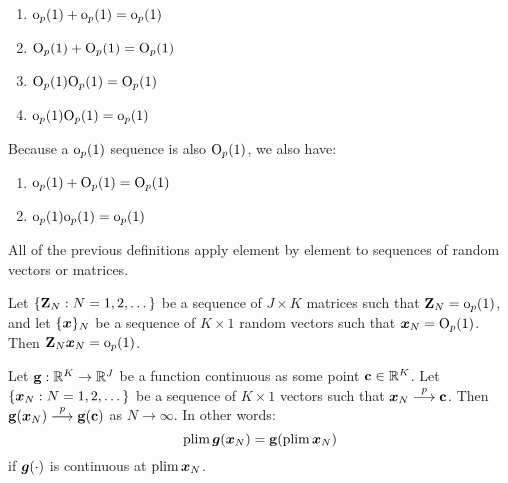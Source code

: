 \documentclass[11pt, oneside, a4paper, article]{article}
\numberwithin{equation}{section}
\begin{document}
\begin{remark}
\item
\begin{enumerate}[noitemsep]
\item $\text{o}_{p}(1) + \text{o}_{p}(1) = \text{o}_{p}(1)$

\item $\text{O}_{p}(1) + \text{O}_{p}(1) = \text{O}_{p}(1)$

\item $\text{O}_{p}(1) \text{O}_{p}(1) = \text{O}_{p}(1)$

\item $\text{o}_{p}(1) \text{O}_{p}(1) = \text{o}_{p}(1)$
\end{enumerate}

\item
Because a $\text{o}_{p}(1)$ sequence is also $\text{O}_{p}(1)$, we also have:

\begin{enumerate}[noitemsep]
\addtocounter{enumi}{4}
\item $\text{o}_{p}(1) + \text{O}_{p}(1) = \text{O}_{p}(1)$

\item $\text{o}_{p}(1) \text{o}_{p}(1) = \text{o}_{p}(1)$
\end{enumerate}

\end{remark}

\begin{remark} All of the previous definitions apply element by element to sequences of random vectors or matrices.
\end{remark}

\begin{lem}
Let $\{\mathbf{Z}_{N} : N = 1, 2, \dots\}$	 be a sequence of $J \times K$ matrices such that $\mathbf{Z}_{N} = \text{o}_{p}(1)$, and let $\{\boldsymbol{x}\}_{N}$ be a sequence of $K \times 1$ random vectors such that $\boldsymbol{x}_{N} = \text{O}_{p}(1)$.
Then $\mathbf{Z}_{N} \boldsymbol{x}_{N} = \text{o}_{p}(1)$.
\end{lem}

\begin{lem}
Let $\mathbf{g}: \mathbb{R}^{K} \to \mathbb{R}^{J}$ be a function continuous as some point $\mathbf{c} \in \mathbb{R}^{K}$.
Let $\{\boldsymbol{x}_{N} : N = 1, 2, \dots\}$ be a sequence of $K \times 1$ vectors such that $\boldsymbol{x}_{N}  \overset{p}{\longrightarrow}  \mathbf{c}$.
Then $\mathbf{g} (\boldsymbol{x}_{N})  \overset{p}{\longrightarrow}  \mathbf{g} (\mathbf{c})$ as $N \to \infty$.
In other words:
\begin{equation}
	\text{plim} \, \boldsymbol{g}(\boldsymbol{x}_{N}) = \mathbf{g} (\text{plim} \, \boldsymbol{x}_{N})
\end{equation}
if $\boldsymbol{g}(\cdot)$ is continuous at $\text{plim} \, \boldsymbol{x}_{N}$.
\end{lem}
\end{document}
